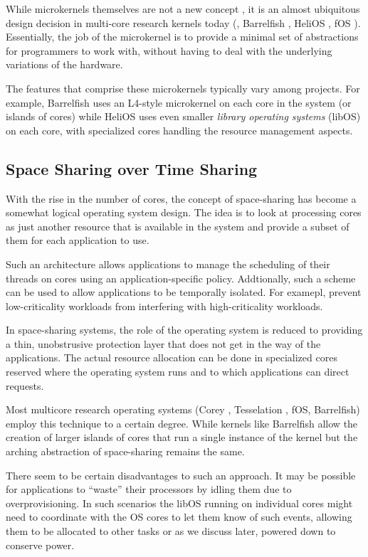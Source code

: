 While microkernels themselves are not a new concept  \cite{Liedtke, Mach, Amoeba}, it is an almost ubiquitous design decision in multi-core research kernels today (\eg, Barrelfish \cite{Barrelfish}, HeliOS \cite{HeliOS}, fOS \cite{fOS}). Essentially, the job of the microkernel is to provide a minimal set of abstractions for programmers to work with, without having to deal with the underlying variations of the hardware.

The features that comprise these microkernels typically vary among projects. For example, Barrelfish uses an L4-style microkernel on each core in the system (or islands of cores) while HeliOS uses even smaller \emph{library operating systems} (libOS) on each core, with specialized cores handling the resource management aspects.

\subsection{Space Sharing over Time Sharing}

With the rise in the number of cores, the concept of space-sharing \cite{Space-Sharing} has become a somewhat logical operating system design. The idea is to look at processing cores as just another resource that is available in the system and provide a subset of them for each application to use.

Such an architecture allows applications to manage the scheduling of their threads on
cores using an application-specific policy. Addtionally, such a scheme can be used to allow applications to be temporally isolated. For examepl, prevent low-criticality workloads from interfering with high-criticality workloads.

In space-sharing systems, the role of the operating system is reduced to providing a thin, unobstrusive protection layer that does not get in the way of the applications. The actual resource allocation can be done in specialized cores reserved where the operating system runs and to which applications can direct requests.

Most multicore research operating systems (\eg Corey \cite{Corey}, Tesselation \cite{Tesselation}, fOS, Barrelfish) employ this technique to a certain degree. While kernels like Barrelfish allow the creation of larger islands of cores that run a single instance of the kernel but the arching abstraction of space-sharing remains the same.

There seem to be certain disadvantages to such an approach. It may be possible for applications to ``waste'' their processors by idling them due to overprovisioning. In such scenarios the libOS running on individual cores might need to coordinate with the OS cores to let them know of such events, allowing them to be allocated to other tasks or as we discuss later, powered down to conserve power.


